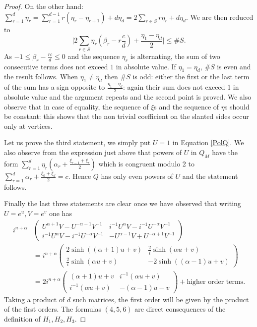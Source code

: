 \documentclass{amsart}
\theoremstyle{definition}
\begin{document}
\begin{proof}
On the other hand: $\sum_{r=1}^d \eta_r=\sum_{r=1}^{d-1}r(\eta_r-\eta_{r+1})+d\eta_d=2\sum_{r\in S}r\eta_r+d\eta_d$. We are then reduced to 
$$\Big|2\sum_{r\in S}\eta_r(\beta_r-r\frac{c}{d})+\frac{\eta_1-\eta_d}{2}\Big|\le \#S.$$
As $-1\le \beta_r-\frac{rc}{d}\le 0$ and the sequence $\eta_r$ is alternating, the sum of two consecutive terms does not exceed $1$ in absolute value. If $\eta_1=\eta_d$, $\#S$ is even and the result follows. When $\eta_1\ne\eta_d$ then $\#S$ is odd: either the first or the last term of the sum has a sign opposite to $\frac{\eta_1-\eta_d}{2}$: again their sum does not exceed 1 in absolute value and the argument repeats and the second point is proved. 
We also observe that in case of equality, the sequence of $\xi$s and the sequence of $\eta$s should be constant: this shows that the non trivial coefficient on the slanted sides occur only at vertices. 

Let us prove the third statement, we simply put $U=1$ in Equation \eqref{PolQ}. We also observe from the expression just above that powers of $U$ in $Q_M$ have the form $\sum_{r=1}^d \eta_r(\alpha_r+\frac{\xi_{r-1}+\xi_{r}}{2})$ which is congruent modulo 2 to $\sum_{r=1}^{d}\alpha_r+\frac{\xi_0+\xi_d}{2}=c$. Hence $Q$ has only even powers of $U$ and the statement follows. 

Finally the last three statements are clear once we have observed that writing $U=e^u, V=e^v$ one has 
\begin{align*}
i^{n+\alpha}&\begin{pmatrix}U^{\alpha+1}V-U^{-\alpha-1}V^{-1}& i^{-1}U^{\alpha}V-i^{-1}U^{-\alpha}V^{-1}\\ i^{-1}U^{\alpha}V-i^{-1}U^{-\alpha}V^{-1}& -U^{\alpha-1}V+U^{-\alpha+1}V^{-1}\end{pmatrix}\\
&=i^{n+\alpha}\begin{pmatrix} 2\sinh((\alpha+1)u+v) & \frac{2}{i}\sinh(\alpha u+v)\\ \frac{2}{i}\sinh(\alpha u+v) & -2\sinh((\alpha-1)u+v)\end{pmatrix}\\
&=2i^{n+\alpha}\begin{pmatrix} (\alpha+1)u+v & i^{-1}(\alpha u+v)\\ i^{-1}(\alpha u+v) & -(\alpha-1)u-v\end{pmatrix}+\text{higher order terms}.
\end{align*}
Taking a product of $d$ such matrices, the first order will be given by the product of the first orders. The formulas $(4,5,6)$ are direct consequences of the definition of $H_1,H_2,H_3$.  
\end{proof}
\end{document}
